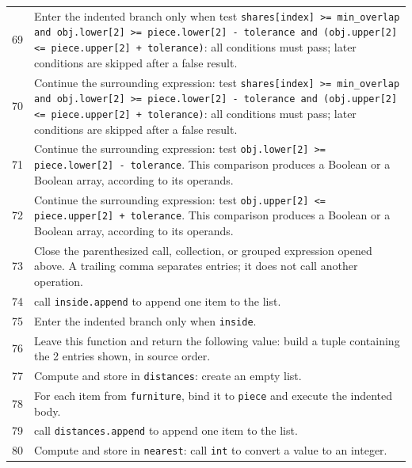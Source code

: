 \documentclass[11pt,a4paper]{book}
\begin{document}
\begin{longtable}{r p{}}
69 & Enter the indented branch only when test \texttt{shares[index] >= min\_overlap and obj.lower[2] >= piece.lower[2] - tolerance and (obj.upper[2] <= piece.upper[2] + tolerance)}: all conditions must pass; later conditions are skipped after a false result. \\

70 & Continue the surrounding expression: test \texttt{shares[index] >= min\_overlap and obj.lower[2] >= piece.lower[2] - tolerance and (obj.upper[2] <= piece.upper[2] + tolerance)}: all conditions must pass; later conditions are skipped after a false result. \\

71 & Continue the surrounding expression: test \texttt{obj.lower[2] >= piece.lower[2] - tolerance}. This comparison produces a Boolean or a Boolean array, according to its operands. \\

72 & Continue the surrounding expression: test \texttt{obj.upper[2] <= piece.upper[2] + tolerance}. This comparison produces a Boolean or a Boolean array, according to its operands. \\

73 & Close the parenthesized call, collection, or grouped expression opened above. A trailing comma separates entries; it does not call another operation. \\

74 & call \texttt{inside.append} to append one item to the list. \\

75 & Enter the indented branch only when \texttt{inside}. \\

76 & Leave this function and return the following value: build a tuple containing the 2 entries shown, in source order. \\

77 & Compute and store in \texttt{distances}: create an empty list.  \\

78 & For each item from \texttt{furniture}, bind it to \texttt{piece} and execute the indented body. \\

79 & call \texttt{distances.append} to append one item to the list. \\

80 & Compute and store in \texttt{nearest}: call \texttt{int} to convert a value to an integer.  \\


\end{longtable}
\end{document}
